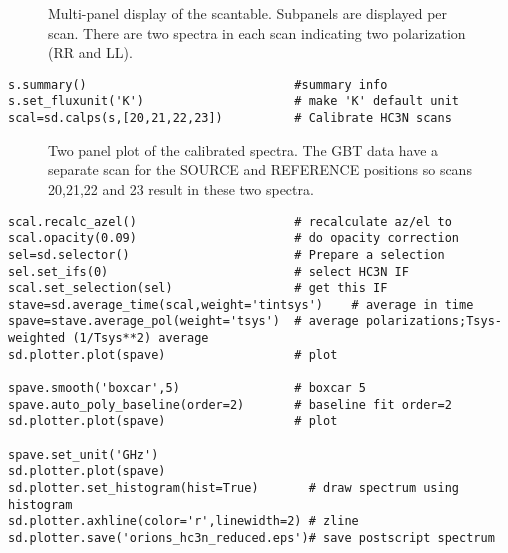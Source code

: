 \begin{figure}[h!]
\caption{\label{fig:scantable} Multi-panel display of the
  scantable. Subpanels are displayed per scan. There are two 
  spectra in each scan indicating two polarization (RR and LL).} 
\hrulefill
\end{figure}
 
\small
\begin{verbatim}
s.summary()                             #summary info                                   
s.set_fluxunit('K')                     # make 'K' default unit
scal=sd.calps(s,[20,21,22,23])          # Calibrate HC3N scans                          
\end{verbatim}
\normalsize

\begin{figure}[h!]
\caption{\label{fig:scal} Two panel plot of the calibrated
  spectra. The GBT data have a separate scan for the SOURCE and
  REFERENCE positions so scans 20,21,22 and 23 result in these two
  spectra.} 
\hrulefill
\end{figure}

\small
\begin{verbatim}
scal.recalc_azel()                      # recalculate az/el to                          
scal.opacity(0.09)                      # do opacity correction                         
sel=sd.selector()                       # Prepare a selection
sel.set_ifs(0)                          # select HC3N IF
scal.set_selection(sel)                 # get this IF
stave=sd.average_time(scal,weight='tintsys')    # average in time
spave=stave.average_pol(weight='tsys')  # average polarizations;Tsys-weighted (1/Tsys**2) average
sd.plotter.plot(spave)                  # plot

spave.smooth('boxcar',5)                # boxcar 5                                      
spave.auto_poly_baseline(order=2)       # baseline fit order=2                          
sd.plotter.plot(spave)                  # plot                                          

spave.set_unit('GHz')                                                                   
sd.plotter.plot(spave)
sd.plotter.set_histogram(hist=True)       # draw spectrum using histogram                 
sd.plotter.axhline(color='r',linewidth=2) # zline                                       
sd.plotter.save('orions_hc3n_reduced.eps')# save postscript spectrum                    
\end{verbatim}
\normalsize

